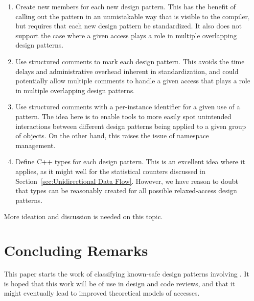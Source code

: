 \documentclass[10]{article}
\begin{document}
\begin{enumerate}
\item	Create new   members for each new
	design pattern.
	This has the benefit of calling out the pattern in an unmistakable
	way that is visible to the compiler, but requires that each
	new design pattern be standardized.
	It also does not support the case where a given access plays a
	role in multiple overlapping design patterns.
\item	Use structured comments to mark each design pattern.
	This avoids the time delays and administrative overhead inherent
	in standardization, and could potentially allow multiple comments
	to handle a given access that plays a role in multiple overlapping
	design patterns.
\item	Use structured comments with a per-instance identifier for
	a given use of a pattern.
	The idea here is to enable tools to more easily spot
	unintended interactions between different design patterns
	being applied to a given group of objects.
	On the other hand, this raises the issue of namespace management.
\item	Define C++  types for each design pattern.
	This is an excellent idea where it applies, as it might well
	for the statistical counters discussed in
	Section~\ref{sec:Unidirectional Data Flow}.
	However, we have reason to doubt that  types can
	be reasonably created for all possible relaxed-access design
	patterns.
\end{enumerate}

More ideation and discussion is needed on this topic.

% 

\section{Concluding Remarks}
\label{sec:Concluding Remarks}

This paper starts the work of classifying known-safe design patterns
involving .
It is hoped that this work will be of use in design and code reviews,
and that it might eventually lead to improved theoretical models of
 accesses.

\clearpage
\appendix
\end{document}
